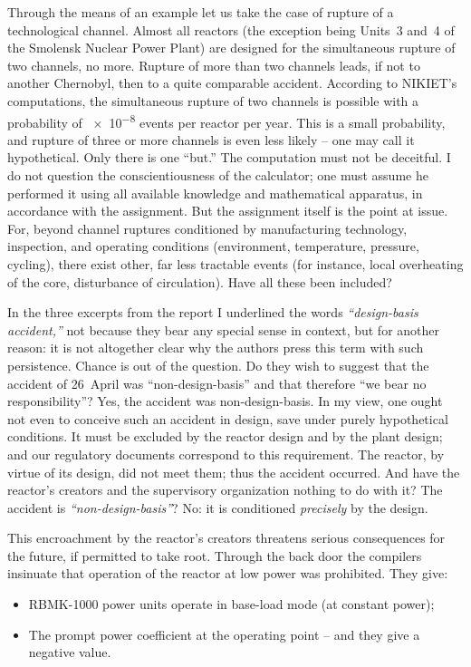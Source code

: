\documentclass[openright]{bookest}
\begin{document}
Through the means of an example let us take the case of rupture of a technological channel. Almost all reactors (the exception being Units~3 and~4 of the Smolensk Nuclear Power Plant) are designed for the simultaneous rupture of two channels, no more. Rupture of more than two channels leads, if not to another Chernobyl, then to a quite comparable accident. According to NIKIET's computations, the simultaneous rupture of two channels is possible with a probability of \num{e-8} events per reactor per year. This is a small probability, and rupture of three or more channels is even less likely -- one may call it hypothetical. Only there is one ``but.'' The computation must not be deceitful. I do not question the conscientiousness of the calculator; one must assume he performed it using all available knowledge and mathematical apparatus, in accordance with the assignment. But the assignment itself is the point at issue. For, beyond channel ruptures conditioned by manufacturing technology, inspection, and operating conditions (environment, temperature, pressure, cycling), there exist other, far less tractable events (for instance, local overheating of the core, disturbance of circulation). Have all these been included?

In the three excerpts from the report I underlined the words \textit{``design-basis accident,''} not because they bear any special sense in context, but for another reason: it is not altogether clear why the authors press this term with such persistence. Chance is out of the question. Do they wish to suggest that the accident of 26~April was ``non-design-basis'' and that therefore ``we bear no responsibility''? Yes, the accident was non-design-basis. In my view, one ought not even to conceive such an accident in design, save under purely hypothetical conditions. It must be excluded by the reactor design and by the plant design; and our regulatory documents correspond to this requirement. The reactor, by virtue of its design, did not meet them; thus the accident occurred. And have the reactor's creators and the supervisory organization nothing to do with it? The accident is \textit{``non-design-basis''}? No: it is conditioned \textit{precisely} by the design.

This encroachment by the reactor's creators threatens serious consequences for the future, if permitted to take root. Through the back door the compilers insinuate that operation of the reactor at low power was prohibited. They give:

\begin{itemize}
\item RBMK-1000 power units operate in base-load mode (at constant power);
\item The prompt power coefficient at the operating point -- and they give a negative value.
\end{itemize}
\end{document}
